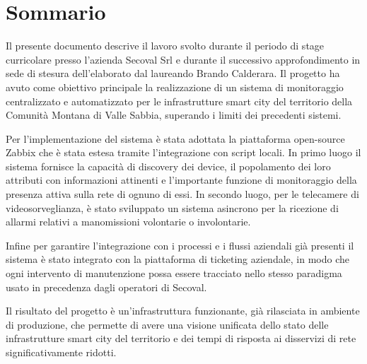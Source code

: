 \documentclass[12pt, a4paper, oneside]{report}
\begin{document}
% 


\clearpage
\thispagestyle{empty} %
\mbox{}               %
\clearpage
\chapter*{Sommario}
Il presente documento descrive il lavoro svolto durante il periodo di stage curricolare presso l'azienda Secoval Srl e durante il successivo approfondimento in sede di stesura dell'elaborato dal laureando Brando Calderara. Il progetto ha avuto come obiettivo principale la realizzazione di un sistema di monitoraggio centralizzato e automatizzato per le infrastrutture smart city del territorio della Comunità Montana di Valle Sabbia, superando i limiti dei precedenti sistemi.

Per l'implementazione del sistema è stata adottata la piattaforma open-source Zabbix che è stata estesa tramite l'integrazione con script locali. In primo luogo il sistema fornisce la capacità di discovery dei device, il popolamento dei loro attributi con informazioni attinenti e l'importante funzione di monitoraggio della presenza attiva sulla rete di ognuno di essi. In secondo luogo, per le telecamere di videosorveglianza, è stato sviluppato un sistema asincrono per la ricezione di allarmi relativi a manomissioni volontarie o involontarie.

Infine per garantire l'integrazione con i processi e i flussi aziendali già presenti il sistema è stato integrato con la piattaforma di ticketing aziendale, in modo che ogni intervento di manutenzione possa essere tracciato nello stesso paradigma usato in precedenza dagli operatori di Secoval.

Il risultato del progetto è un'infrastruttura funzionante, già rilasciata in ambiente di produzione, che permette di avere una visione unificata dello stato delle infrastrutture smart city del territorio e dei tempi di risposta ai disservizi di rete significativamente ridotti.

\clearpage
\tableofcontents

\clearpage
\listoffigures
{}
\end{document}

